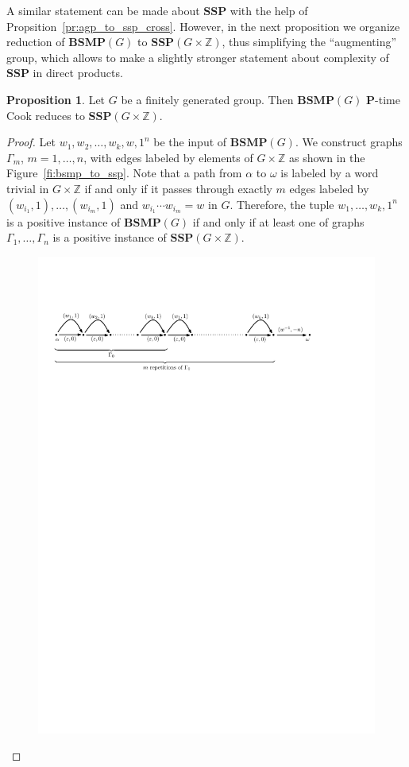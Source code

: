 \documentclass[10pt]{amsart}
\theoremstyle{definition}
\newtheorem{proposition}[theorem]{Proposition}
\def\P{{\mathbf{P}}}
\def\SSP{{\mathbf{SSP}}}
\def\BSMP{{\mathbf{BSMP}}}
\begin{document}
A similar statement can be made about $\SSP$ with the help of Propsition~\ref{pr:agp_to_ssp_cross}. %
However, in the next proposition we organize reduction of $\BSMP(G)$ to $\SSP(G\times \mathbb Z)$, thus simplifying the ``augmenting'' group, which allows to make a slightly stronger statement about complexity of $\SSP$ in direct products.

\begin{proposition}\label{pr:bsmp_to_ssp}
Let $G$ be a finitely generated group. Then $\BSMP(G)$ $\P$-time Cook reduces to $\SSP(G\times \mathbb Z)$.
\end{proposition}
\begin{proof} Let $w_1,w_2,\ldots, w_k, w, 1^n$ be the input of $\BSMP(G)$. We construct graphs $\Gamma_m$, $m=1,\ldots, n$, with edges labeled by elements of $G\times \mathbb Z$ as shown in the Figure~\ref{fi:bsmp_to_ssp}. Note that a path from $\alpha$ to $\omega$ is labeled by a word trivial in $G\times\mathbb Z$ if and only if it passes through exactly $m$ edges labeled by $(w_{i_1},1),\ldots,(w_{i_m},1)$ and $w_{i_1}\cdots w_{i_m}=w$ in $G$. Therefore, the tuple $w_1,\ldots,w_k,1^n$ is a positive instance of $\BSMP(G)$ if and only if at least one of graphs $\Gamma_1,\ldots, \Gamma_n$ is a positive instance of $\SSP(G\times\mathbb Z)$.
\begin{figure}[h]
 \centering
 \includegraphics[width=6in]{bsmp_to_ssp}

\end{figure}
\end{proof}
\end{document}
